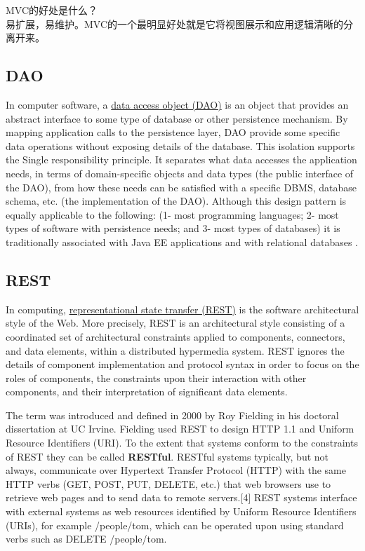 MVC的好处是什么？\\
易扩展，易维护。MVC的一个最明显好处就是它将视图展示和应用逻辑清晰的分离开来。



\subsection{DAO}

In computer software, a
\href{https://en.wikipedia.org/wiki/Data_access_object}{data access object (DAO)}
 is an object that provides an abstract interface to some type of database or other persistence mechanism.
By mapping application calls to the persistence layer, DAO provide some specific data operations without exposing details of the database. 
This isolation supports the Single responsibility principle. 
It separates what data accesses the application needs, in terms of domain-specific objects and data types (the public interface of the DAO), from how these needs can be satisfied with a specific DBMS, database schema, etc. (the implementation of the DAO).
Although this design pattern is equally applicable to the following: (1- most
programming languages; 2- most types of software with persistence needs; and 3- most types of databases) it is traditionally associated with Java EE applications and with relational databases .



\subsection{REST}

In computing, \href{https://en.wikipedia.org/wiki/Representational_state_transfer}{representational state transfer (REST)} 
is the software architectural style of the Web.
More precisely, REST is an architectural style consisting of a coordinated set
of architectural constraints applied to components, connectors, and data elements, within a distributed hypermedia system. 
REST ignores the details of component implementation and protocol syntax in order to focus on the roles of components, the constraints upon their interaction with other components, and their interpretation of significant data elements.

The term was introduced and defined in 2000 by Roy Fielding in his doctoral dissertation at UC Irvine.
Fielding used REST to design HTTP 1.1 and Uniform Resource Identifiers (URI).
To the extent that systems conform to the constraints of REST they can be called \textbf{RESTful}.
RESTful systems typically, but not always, communicate over Hypertext Transfer Protocol (HTTP) with the same HTTP verbs (GET, POST, PUT, DELETE, etc.) that web browsers use to retrieve web pages and to send data to remote servers.[4] REST systems interface with external systems as web resources identified by Uniform Resource Identifiers (URIs),
 for example /people/tom, which can be operated upon using standard verbs such as DELETE /people/tom.

